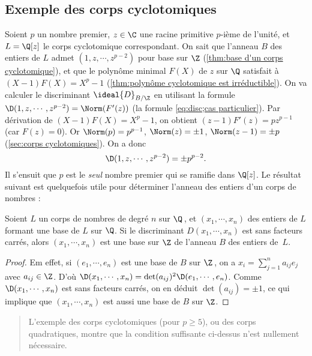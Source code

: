 \documentclass[11pt, %
  title in boldface,
  theorem in new line,
  theorem numbering = section,
  number theorems separately,
  simple name,
]{beaulivre}
\begin{document}
    \subsection*{Exemple des corps cyclotomiques}
        Soient \( p \) un nombre premier, \( z \in \C \) une racine primitive \( p \)‑ième de l'unité, et \( L = \Q[z] \) le corps cyclotomique correspondant. On sait que l'anneau \( B \) des entiers de \( L \) admet \( (1, z, \cdots, z^{p-2}) \) pour base sur \( \Z \) (\cref{thm:base d'un corps cyclotomique}), et que le polynôme minimal \( F(X) \) de \( z \) sur \( \Q \) satisfait à \( (X-1)F(X) = X^p-1 \) (\cref{thm:polynôme cyclotomique est irréductible}). On va calculer le discriminant \( \ideal{D}_{B/\Z} \) en utilisant la formule \( \D(1, z, \cdots, z^{p-2}) = \Norm(F'(z)) \) (la formule \eqref{eq:disc;cas particulier}). Par dérivation de \( (X-1)F(X) = X^p-1 \), on obtient \( (z-1)F'(z) = p z^{p-1} \) (car \( F(z) = 0 \)). Or \( \Norm(p) = p^{p-1} \), \( \Norm(z) = \pm 1 \), \( \Norm(z-1) = \pm p \) (\cref{sec:corps cyclotomiques}). On a donc
        \begin{equation}
            \D(1, z, \cdots, z^{p-2}) = \pm p^{p-2}.
        \end{equation}
        Il s'ensuit que \( p \) est le \emph{seul} nombre premier qui se ramifie dans \( \Q[z] \). Le résultat suivant est quelquefois utile pour déterminer l'anneau des entiers d'un corps de nombres :
        \begin{proposition}
            Soient \( L \) un corps de nombres de degré \( n \) sur \( \Q \)\,, et \( (x_1, \cdots, x_n) \) des entiers de \( L \) formant une base de \( L \) sur \( \Q \). Si le discriminant \( D(x_1, \cdots, x_n) \) est sans facteurs carrés, alors \( (x_1, \cdots, x_n) \) est une base sur \( \Z \) de l'anneau \( B \) des entiers de~\( L \).
        \end{proposition}
        \begin{proof}
            Em effet, si \( (e_1, \cdots, e_n) \) est une base de \( B \) sur \( \Z \)\,, on a \( x_i = \sum_{j=1}^n a_{ij} e_j \) avec \( a_{ij} \in \Z \). D'où \( \D(x_1, \cdots, x_n) = \det(a_{ij})^2 \D(e_1, \cdots, e_n) \). Comme \( \D(x_1, \cdots, x_n) \) est sans facteurs carrés, on en déduit \( \det(a_{ij}) = \pm 1 \), ce qui implique que \( (x_1, \cdots, x_n) \) est aussi une base de \( B \) sur \( \Z \).
        \end{proof}

        \begin{quote}
            L'exemple des corps cyclotomiques (pour \( p \geqslant 5 \)), ou des corps quadratiques, montre que la condition suffisante ci-dessus n'est nullement nécessaire.
        \end{quote}
\end{document}
